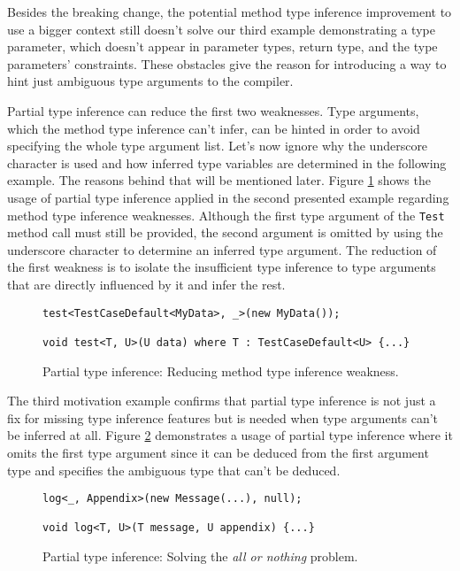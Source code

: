 \par
{}
Besides the breaking change, the potential method type inference improvement to use a bigger context still doesn’t solve our third example demonstrating a type parameter, which doesn’t appear in parameter types, return type, and the type parameters’ constraints. 
These obstacles give the reason for introducing a way to hint just ambiguous type arguments to the compiler.
\par
{}
Partial type inference can reduce the first two weaknesses. 
Type arguments, which the method type inference can’t infer, can be hinted in order to avoid specifying the whole type argument list. 
Let’s now ignore why the underscore character is used and how inferred type variables are determined in the following example. 
The reasons behind that will be mentioned later.
Figure \ref{img32:sol1} shows the usage of partial type inference applied in the second presented example regarding method type inference weaknesses. 
Although the first type argument of the \texttt{Test} method call must still be provided, the second argument is omitted by using the underscore character to determine an inferred type argument. 
The reduction of the first weakness is to isolate the insufficient type inference to type arguments that are directly influenced by it and infer the rest.
\begin{figure}[h]
\begin{lstlisting}[style=csharp]
test<TestCaseDefault<MyData>, _>(new MyData());

void test<T, U>(U data) where T : TestCaseDefault<U> {...}
\end{lstlisting}
\caption{Partial type inference: Reducing method type inference weakness.}
\label{img32:sol1}
\end{figure}
\par
{}
The third motivation example confirms that partial type inference is not just a fix for missing type inference features but is needed when type arguments can’t be inferred at all. 
Figure \ref{img33:sol2} demonstrates a usage of partial type inference where it omits the first type argument since it can be deduced from the first argument type and specifies the ambiguous type that can’t be deduced.
\begin{figure}[h]
\begin{lstlisting}[style=csharp]
log<_, Appendix>(new Message(...), null);

void log<T, U>(T message, U appendix) {...}
\end{lstlisting}
\caption{Partial type inference: Solving the \textit{all or nothing} problem.}
\label{img33:sol2}
\end{figure}
